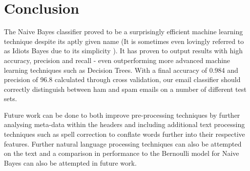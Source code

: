 \section{Conclusion}

The Naive Bayes classifier proved to be a surprisingly efficient machine learning technique despite its aptly given name (It is sometimes even lovingly referred to as Idiots Bayes due to its simplicity \cite{idiotsbayes2001}).
It has proven to output results with high accuracy, precision and recall - even outperforming more advanced machine learning techniques such as Decision Trees.
With a final accuracy of 0.984 and precision of 96.8 calculated through cross validation, our email classifier should correctly distinguish between ham and spam emails on a number of different test sets.

Future work can be done to both improve pre-processing techniques by further analysing meta-data within the headers and including additional text processing techniques such as spell correction to conflate words further into their respective features. Further natural language processing techniques can also be attempted on the text and a comparison in performance to the Bernoulli model for Naive Bayes can also be attempted in future work.

